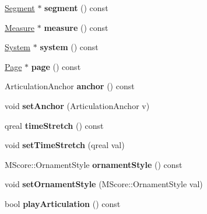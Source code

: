 \begin{DoxyCompactItemize}
\hyperlink{class_ms_1_1_segment}{Segment} $\ast$ {\bfseries segment} () const
\item 
\mbox{\label{class_ms_1_1_articulation_a0ce14320ad0cfa930bacd7ebb61d7ccd}} 
\hyperlink{class_ms_1_1_measure}{Measure} $\ast$ {\bfseries measure} () const
\item 
\mbox{\label{class_ms_1_1_articulation_a8f17520ff3fdc38c041aa0bf9a6fe92c}} 
\hyperlink{class_ms_1_1_system}{System} $\ast$ {\bfseries system} () const
\item 
\mbox{\label{class_ms_1_1_articulation_ae1f2ab080b940f733d6b1cd640d40304}} 
\hyperlink{class_ms_1_1_page}{Page} $\ast$ {\bfseries page} () const
\item 
\mbox{\label{class_ms_1_1_articulation_abc0906191a41cf8069929cd3827bc3e2}} 
Articulation\+Anchor {\bfseries anchor} () const
\item 
\mbox{\label{class_ms_1_1_articulation_a1148ed5d3d77bacb20c3b762fc253d23}} 
void {\bfseries set\+Anchor} (Articulation\+Anchor v)
\item 
\mbox{\label{class_ms_1_1_articulation_a51cffa4b0802760a4017870f515772f7}} 
qreal {\bfseries time\+Stretch} () const
\item 
\mbox{\label{class_ms_1_1_articulation_a66d386b4943a9e26e5aeb9d5bc2929e7}} 
void {\bfseries set\+Time\+Stretch} (qreal val)
\item 
\mbox{\label{class_ms_1_1_articulation_a77a2ceab74bc1c76aad03b1a3bbecd25}} 
M\+Score\+::\+Ornament\+Style {\bfseries ornament\+Style} () const
\item 
\mbox{\label{class_ms_1_1_articulation_aabea04e7d362e19849ce8f4065886e9c}} 
void {\bfseries set\+Ornament\+Style} (M\+Score\+::\+Ornament\+Style val)
\item 
\mbox{\label{class_ms_1_1_articulation_afbbec6c391d88ecd3ef88db1be6606bc}} 
bool {\bfseries play\+Articulation} () const

\end{DoxyCompactItemize}
